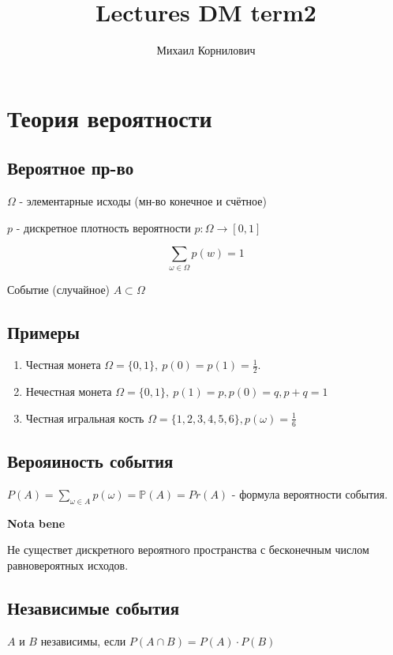 \documentclass{article}
\title{Lectures DM term2}
\author{Михаил Корнилович}
\begin{document}
    \maketitle
    \newpage

	\section{Теория вероятности}
	\subsection{Вероятное пр-во}
	$\Omega$ - элементарные исходы (мн-во конечное и счётное) 
	
	\noindent$p$ - дискретное плотность вероятности
	$p: \Omega \to [0, 1]$
	
	$$
	\sum\limits_{\omega \in \Omega}p(w) = 1
	$$
	
	\noindent Событие (случайное) $A \subset \Omega$
	
	\subsection{Примеры}
	\begin{enumerate}
		\item Честная монета $\Omega = \{0, 1\},\ p(0) = p(1) = \frac{1}{2}$.
		\item Нечестная монета $\Omega = \{0, 1\},\ p(1) = p, p(0) = q, p + q = 1$
		\item Честная игральная кость $\Omega = \{1, 2, 3, 4, 5, 6\}, p(\omega) = \frac{1}{6}$
	\end{enumerate}
	
	\subsection{Верояиность события}
	$P(A) = \sum\limits_{\omega \in A}p(\omega) = \mathbb{P}(A) = Pr(A)$ - формула вероятности события.
	
	{\bf Nota bene} 
	
	\noindent Не существет дискретного вероятного пространства с бесконечным числом равновероятных исходов.
	
	\subsection{Независимые события}
	$A$ и $B$ независимы, если $P(A \cap B) = P(A) \cdot P(B)$
	
\end{document}
